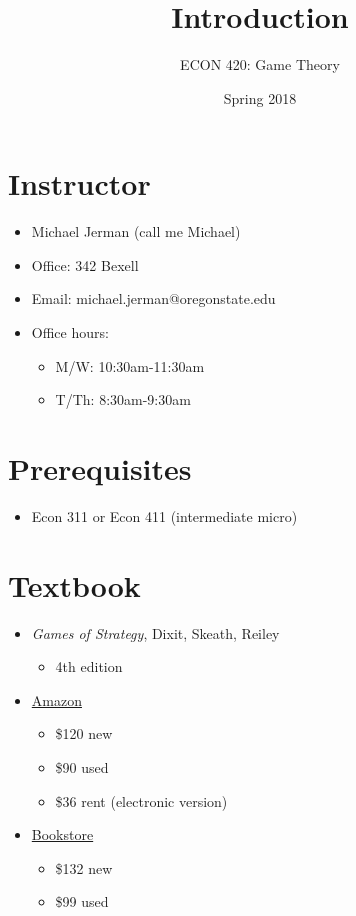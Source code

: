 \documentclass[11pt]{article}
\author{ECON 420: Game Theory}
\date{Spring 2018}
\title{Introduction}
\begin{document}
\maketitle

\section*{Instructor}
\label{sec:org7bfbcce}
\begin{itemize}
\item Michael Jerman (call me Michael)
\item Office: 342 Bexell
\item Email: michael.jerman@oregonstate.edu
\item Office hours:
\begin{itemize}
\item M/W: 10:30am-11:30am
\item T/Th: 8:30am-9:30am
\end{itemize}
\end{itemize}

\section*{Prerequisites}
\label{sec:org41b5574}
\begin{itemize}
\item Econ 311 or Econ 411 (intermediate micro)
\end{itemize}

\section*{Textbook}
\label{sec:orgdf38453}
\begin{itemize}
\item \emph{Games of Strategy}, Dixit, Skeath, Reiley
\begin{itemize}
\item 4th edition
\end{itemize}
\item \href{https://www.amazon.com/Games-Strategy-Fourth-Avinash-Dixit/dp/0393919684/}{Amazon}
\begin{itemize}
\item \$120 new
\item \$90 used
\item \$36 rent (electronic version)
\end{itemize}
\item \href{http://verbacompare.osubeaverstore.com/compare/2018-Spring\_\_ECON\_\_420\_\_001}{Bookstore}
\begin{itemize}
\item \$132 new
\item \$99 used
\end{itemize}
\end{itemize}
\end{document}
